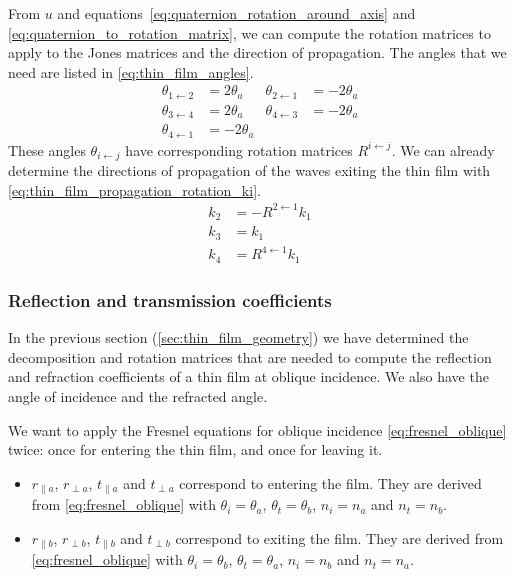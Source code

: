 From $u$ and
equations~\eqref{eq:quaternion_rotation_around_axis}
and \eqref{eq:quaternion_to_rotation_matrix}, we can compute the rotation matrices to apply to the Jones matrices and the direction of propagation.
The angles that we need are listed in \cref{eq:thin_film_angles}.
\begin{equation}
    \begin{aligned}
        \theta_{1 \leftarrow 2} &= 2 \theta_a
        &
        \theta_{2 \leftarrow 1} &= -2 \theta_a
        \\
        \theta_{3 \leftarrow 4} &= 2 \theta_a
        &
        \theta_{4 \leftarrow 3} &= -2 \theta_a
        \\
        \theta_{4 \leftarrow 1} &= -2 \theta_a
    \end{aligned}
    \label{eq:thin_film_angles}
\end{equation}
These angles $\theta_{i \leftarrow j}$ have corresponding rotation matrices $R^{i \leftarrow j}$.
We can already determine the directions of propagation of the waves exiting the thin film with \cref{eq:thin_film_propagation_rotation_ki}.
\begin{subequations}
    \begin{align}
        k_2 &= -R^{2 \leftarrow 1} k_1
        \label{eq:thin_film_propagation_rotation_k2}\\
        k_3 &= k_1
        \label{eq:thin_film_propagation_rotation_k3}\\
        k_4 &= R^{4 \leftarrow 1} k_1
        \label{eq:thin_film_propagation_rotation_k4}
    \end{align}
    \label{eq:thin_film_propagation_rotation_ki}
\end{subequations}

\subsubsection{Reflection and transmission coefficients}
In the previous section (\cref{sec:thin_film_geometry}) we have determined the decomposition and rotation matrices that are needed to compute the reflection and refraction coefficients of a thin film at oblique incidence.
We also have the angle of incidence and the refracted angle.

We want to apply the Fresnel equations for oblique incidence \eqref{eq:fresnel_oblique} twice:
once for entering the thin film, and once for leaving it.
\begin{itemize}
    \item 
$r_{\parallel a}$, $r_{\perp a}$, $t_{\parallel a}$ and $t_{\perp a}$ correspond to entering the film.
They are derived from \cref{eq:fresnel_oblique} with
$\theta_i = \theta_a$, $\theta_t = \theta_b$,
$n_i = n_a$ and $n_t = n_b$.
    \item
$r_{\parallel b}$, $r_{\perp b}$, $t_{\parallel b}$ and $t_{\perp b}$ correspond to exiting the film.
They are derived from \cref{eq:fresnel_oblique} with
$\theta_i = \theta_b$, $\theta_t = \theta_a$,
$n_i = n_b$ and $n_t = n_a$.
\end{itemize}

